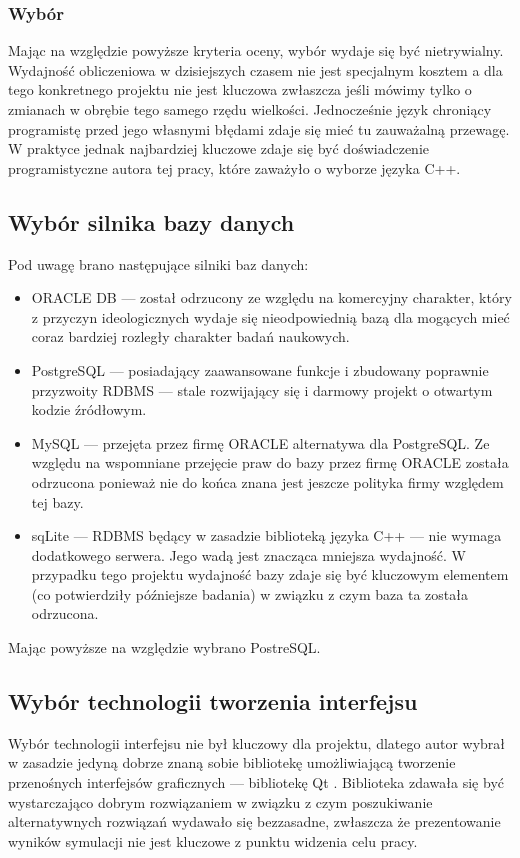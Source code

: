 {\subsubsection{Wybór}
\par{
Mając na względzie powyższe kryteria oceny, wybór wydaje się być nietrywialny. Wydajność obliczeniowa w dzisiejszych czasem nie jest specjalnym kosztem a dla tego konkretnego projektu nie jest kluczowa zwłaszcza jeśli mówimy tylko o zmianach w obrębie tego samego rzędu wielkości. Jednocześnie język chroniący programistę przed jego własnymi błędami zdaje się mieć tu zauważalną przewagę. W praktyce jednak najbardziej kluczowe zdaje się być doświadczenie programistyczne autora tej pracy, które zaważyło o wyborze języka C++.
}

\subsection{Wybór silnika bazy danych}
\par{
Pod uwagę brano następujące silniki baz danych:
\begin{itemize}
\item ORACLE DB --- został odrzucony ze względu na komercyjny charakter, który z przyczyn ideologicznych wydaje się nieodpowiednią bazą dla mogących mieć coraz bardziej rozległy charakter badań naukowych.
\item PostgreSQL --- posiadający zaawansowane funkcje i zbudowany poprawnie przyzwoity RDBMS --- stale rozwijający się i darmowy projekt o otwartym kodzie źródłowym.
\item MySQL --- przejęta przez firmę ORACLE alternatywa dla PostgreSQL. Ze względu na wspomniane przejęcie praw do bazy przez firmę ORACLE została odrzucona ponieważ nie do końca znana jest jeszcze polityka firmy względem tej bazy.
\item sqLite --- RDBMS będący w zasadzie biblioteką języka C++ --- nie wymaga dodatkowego serwera. Jego wadą jest znacząca mniejsza wydajność. W przypadku tego projektu wydajność bazy zdaje się być kluczowym elementem (co potwierdziły późniejsze badania) w związku z czym baza ta została odrzucona.
\end{itemize}
Mając powyższe na względzie wybrano PostreSQL.
}

\subsection{Wybór technologii tworzenia interfejsu}
\par{
Wybór technologii interfejsu nie był kluczowy dla projektu, dlatego autor wybrał w zasadzie jedyną dobrze znaną sobie bibliotekę umożliwiającą tworzenie przenośnych interfejsów graficznych --- bibliotekę Qt \cite{Qt}. Biblioteka zdawała się być wystarczająco dobrym rozwiązaniem w związku z czym poszukiwanie alternatywnych rozwiązań wydawało się bezzasadne, zwłaszcza że prezentowanie wyników symulacji nie jest kluczowe z punktu widzenia celu pracy.
}

}
